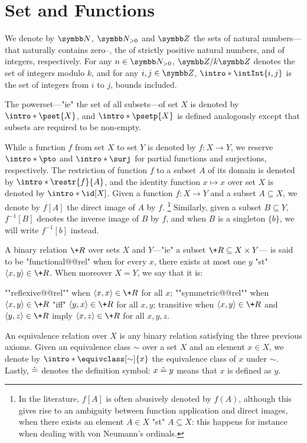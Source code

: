 \section{Set and Functions}

We denote by $\N$, $\Np$ and $\Z$ the sets of natural numbers---that naturally contains zero--, the
of strictly positive natural numbers, and of integers, respectively.
For any $n\in\Np$, $\ZnZ{k}$ denotes the set of integers modulo $k$,
and for any $i,j \in \Z$, $\intro*\intInt{i,j}$ is the set of integers from $i$ to $j$,
bounds included.

The powerset---"ie" the set of all subsets---of set $X$
is denoted by $\intro*\pset{X}$, and $\intro*\psetp{X}$ is defined analogously
except that subsets are required to be non-empty.

While a function $f$ from set $X$ to set $Y$ is denoted by $f\colon X \to Y$,
we reserve $\intro*\pto$ and $\intro*\surj$ for partial functions and surjections, respectively.
The restriction of function $f$ to a subset $A$ of its domain is denoted by
$\intro*\restr{f}{A}$, and the identity function $x \mapsto x$ over set $X$
is denoted by $\intro*\id[X]$.
Given a function $f\colon X \to Y$ and a subset $A \subseteq X$,
we denote by $f[A]$ the direct image of $A$ by $f$.%
\footnote{In the literature, $f[A]$ is often abusively denoted by $f(A)$, although
this gives rise to an ambiguity between function application and direct images,
when there exists an element $A \in X$ "st" $A \subseteq X$: this happens for instance
when dealing with von Neumann's ordinals.}
Similarly, given a subset $B \subseteq Y$, $f^{-1}[B]$ denotes
the inverse image of $B$ by $f$, and when $B$ is a singleton $\{b\}$,
we will write $f^{-1}[b]$ instead.%

A binary relation $\+R$ over sets $X$ and $Y$---"ie" a subset $\+R \subseteq X \times Y$---
is said to be "functional@@rel" when for every $x$, there exists at most one $y$
"st" $\tup{x,y} \in \+R$.
When moreover $X = Y$, we say that it is:
\begin{itemize}
	\itemAP ""reflexive@@rel"" when $\tup{x,x} \in \+R$ for all $x$;
	\itemAP ""symmetric@@rel"" when $\tup{x,y} \in \+R$ "iff" $\tup{y,x} \in \+R$
		for all $x,y$;
	\itemAP transitive when $\tup{x,y} \in \+R$ and $\tup{y,z} \in \+R$
		imply $\tup{x,z} \in \+R$
		for all $x,y,z$.
\end{itemize}
An equivalence relation over $X$ is any binary relation satisfying the three previous axioms.
Given an equivalence class $\sim$ over a set $X$ and an element $x \in X$,
we denote by $\intro*\equivclass[\sim]{x}$ the equivalence class of $x$ under $\sim$.
Lastly, $\mathrel{\hat{=}}$ denotes the definition symbol: $x \mathrel{\hat{=}} y$ means that $x$ is defined as $y$.


